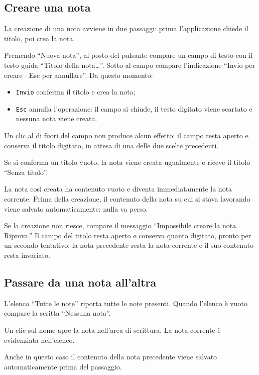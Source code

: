 \documentclass[a4paper, 10pt]{article}
\begin{document}
\subsection{Creare una nota}
\label{sec:creare-nota}
La creazione di una nota avviene in due passaggi: prima l'applicazione chiede il titolo, poi crea la nota.

Premendo ``Nuova nota'', al posto del pulsante compare un campo di testo con il testo guida ``Titolo della nota\ldots''. Sotto al campo compare l'indicazione ``Invio per creare $\cdot$ Esc per annullare''. Da questo momento:

\begin{itemize}
    \item \texttt{Invio} conferma il titolo e crea la nota;

    \item \texttt{Esc} annulla l'operazione: il campo si chiude, il testo digitato viene scartato e nessuna nota viene creata.
\end{itemize}

Un clic al di fuori del campo non produce alcun effetto: il campo resta aperto e conserva il titolo digitato, in attesa di una delle due scelte precedenti.

Se si conferma un titolo vuoto, la nota viene creata ugualmente e riceve il titolo ``Senza titolo''.

La nota così creata ha contenuto vuoto e diventa immediatamente la nota corrente. Prima della creazione, il contenuto della nota su cui si stava lavorando viene salvato automaticamente: nulla va perso.

Se la creazione non riesce, compare il messaggio ``Impossibile creare la nota. Riprova.'' Il campo del titolo resta aperto e conserva quanto digitato, pronto per un secondo tentativo; la nota precedente resta la nota corrente e il suo contenuto resta invariato.

\subsection{Passare da una nota all'altra}
\label{sec:passare-nota}
L'elenco ``Tutte le note'' riporta tutte le note presenti. Quando l'elenco è vuoto compare la scritta ``Nessuna nota''.

Un clic sul nome apre la nota nell'area di scrittura. La nota corrente è evidenziata nell'elenco.

Anche in questo caso il contenuto della nota precedente viene salvato automaticamente prima del passaggio.
\end{document}
